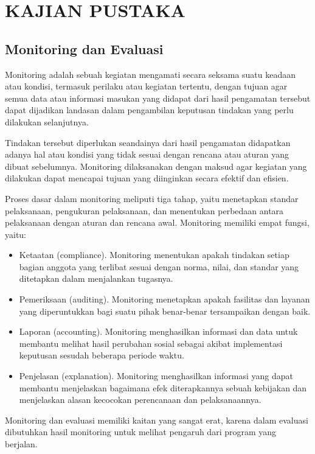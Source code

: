 
\chapter{KAJIAN PUSTAKA}                

\section{Monitoring dan Evaluasi}

	Monitoring adalah sebuah kegiatan mengamati secara seksama suatu keadaan atau kondisi, termasuk perilaku atau kegiatan tertentu, dengan tujuan agar semua data atau informasi masukan yang didapat dari hasil pengamatan tersebut dapat dijadikan landasan dalam pengambilan keputusan tindakan yang perlu dilakukan selanjutnya. 

	Tindakan tersebut diperlukan seandainya dari hasil pengamatan didapatkan adanya hal atau kondisi yang tidak sesuai dengan rencana atau aturan yang dibuat sebelumnya. Monitoring dilaksanakan dengan maksud agar kegiatan yang dilakukan dapat mencapai tujuan yang diinginkan secara efektif dan efisien.

	Proses dasar dalam monitoring meliputi tiga tahap, yaitu menetapkan standar pelaksanaan, pengukuran pelaksanaan, dan menentukan perbedaan antara pelaksanaan dengan aturan dan rencana awal. Monitoring memiliki empat fungsi, yaitu: \citep{Dunn2014}
\begin{itemize}
	\item Ketaatan (compliance). Monitoring menentukan apakah tindakan setiap bagian anggota yang terlibat sesuai dengan norma, nilai, dan standar yang ditetapkan dalam menjalankan tugasnya.
	\item Pemeriksaan (auditing). Monitoring menetapkan apakah fasilitas dan layanan yang diperuntukkan bagi suatu pihak benar-benar tersampaikan dengan baik.
	\item Laporan (accounting). Monitoring menghasilkan informasi dan data untuk membantu melihat hasil perubahan sosial sebagai akibat implementasi keputusan sesudah beberapa periode waktu.
	\item Penjelasan (explanation). Monitoring menghasilkan informasi yang dapat membantu menjelaskan bagaimana efek diterapkannya sebuah kebijakan dan menjelaskan alasan kecocokan perencanaan dan pelaksanaannya.
\end{itemize}
	Monitoring dan evaluasi memiliki kaitan yang sangat erat, karena dalam evaluasi dibutuhkan hasil monitoring untuk melihat pengaruh dari program yang berjalan.

